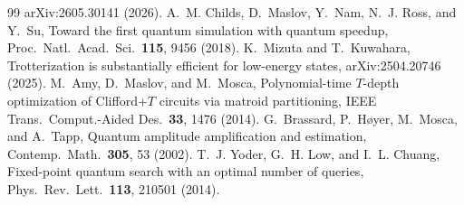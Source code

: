 \documentclass[aps,pra,twocolumn,superscriptaddress,nofootinbib]{revtex4-2}
\begin{document}
\begin{thebibliography}{99}
  arXiv:2605.30141 (2026).
 A.~M. Childs, D.~Maslov, Y.~Nam, N.~J. Ross, and Y.~Su, Toward the first quantum
  simulation with quantum speedup, Proc.\ Natl.\ Acad.\ Sci.\ \textbf{115}, 9456 (2018).
 K.~Mizuta and T.~Kuwahara, Trotterization is substantially efficient for low-energy
  states, arXiv:2504.20746 (2025).
 M.~Amy, D.~Maslov, and M.~Mosca, Polynomial-time $T$-depth optimization of Clifford+$T$
  circuits via matroid partitioning, IEEE Trans.\ Comput.-Aided Des.\ \textbf{33}, 1476 (2014).
 G.~Brassard, P.~H{\o}yer, M.~Mosca, and A.~Tapp, Quantum amplitude amplification and
  estimation, Contemp.\ Math.\ \textbf{305}, 53 (2002).
 T.~J. Yoder, G.~H. Low, and I.~L. Chuang, Fixed-point quantum search with an optimal number
  of queries, Phys.\ Rev.\ Lett.\ \textbf{113}, 210501 (2014).
\end{thebibliography}
\end{document}
